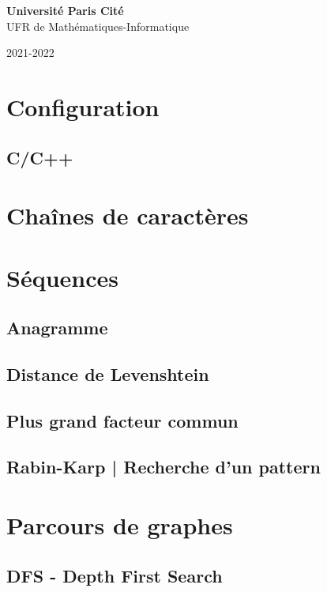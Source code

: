 \documentclass[8pt]{article}
\begin{document}
\begin{titlepage}
\begin{center}
        \textbf{Université Paris Cité}\\
        UFR de Mathématiques-Informatique

        2021-2022

    \end{center}
\end{titlepage}
    \section{Configuration}
        \subsection{C/C++}
        
    \section{Chaînes de caractères}
    \section{Séquences}
        \subsection{Anagramme}
        {\scriptsize}
        \subsection{Distance de Levenshtein}
        {\scriptsize}
        \subsection{Plus grand facteur commun}
        {\scriptsize}
        \subsection{Rabin-Karp | Recherche d'un pattern}
        {\scriptsize}
    \section{Parcours de graphes}
        \subsection{DFS - Depth First Search}
        {\scriptsize}
\end{document}
